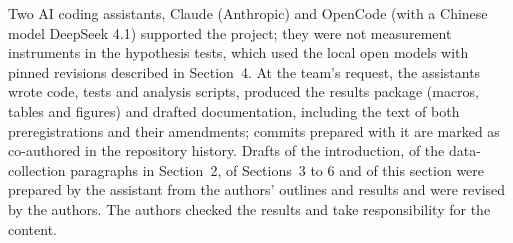 \documentclass[10pt,a4paper]{article}
\begin{document}
Two AI coding assistants, Claude (Anthropic) and OpenCode (with a Chinese model DeepSeek 4.1) supported the
project; they were not measurement instruments in the hypothesis tests, which used the local
open models with pinned revisions described in Section~4. At the team's request, the
assistants wrote code, tests and analysis scripts, produced the results package (macros,
tables and figures) and drafted documentation, including the text of both preregistrations
and their amendments; commits prepared with it are marked as co-authored in the
repository history. 
Drafts of the introduction, of the data-collection paragraphs in Section~2, of Sections~3
to 6 and of this section were prepared by the assistant from the authors' outlines and
results and were revised by the authors.
The authors checked the results and take responsibility for the content.

\end{document}
